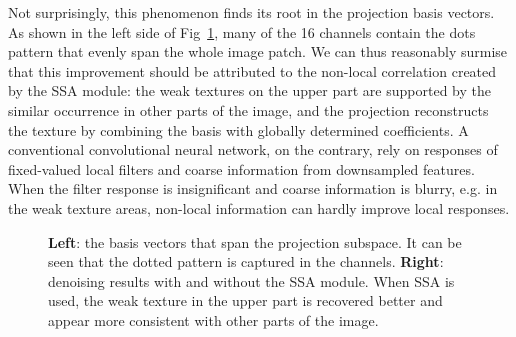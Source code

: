 \documentclass[final]{cvpr}
\begin{document}
Not surprisingly, this phenomenon finds its root in the projection basis vectors. 
As shown in the left side of Fig~\ref{fig:basis vector visual}, many of the 16 channels contain the dots  pattern that evenly span the whole image patch. 
We can thus reasonably surmise that this 
improvement should be attributed to the non-local correlation created by the 
SSA module: the weak textures on the upper part are supported by 
the similar occurrence in other parts of the image, and the projection reconstructs
the texture by combining the basis with globally determined coefficients.
A conventional convolutional neural network, on the contrary, rely on responses
of fixed-valued local filters and coarse information from downsampled features. 
When the filter response is insignificant and coarse information is blurry, 
e.g. in the weak texture areas, non-local information can hardly improve local responses.  
\begin{figure}[t]
   \begin{center}
   \end{center}
\caption{\small {\textbf{Left}: the basis vectors that span the projection subspace. It can be seen that the dotted pattern is captured in the channels. \textbf{Right}: denoising results with and without the SSA module. When SSA is used, the weak texture in the upper part is recovered better and appear more consistent with other parts of the image.
   } }
   \label{fig:basis vector visual}
   
\end{figure} 
\end{document}

